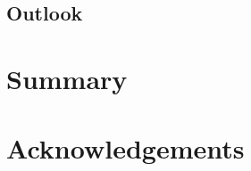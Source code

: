 \hypertarget{conclusion2}{%
  \subsection{Outlook}}

\hypertarget{summary}{%
  \section{Summary}}

\hypertarget{acknowledgements}{%
  \section{Acknowledgements}}

